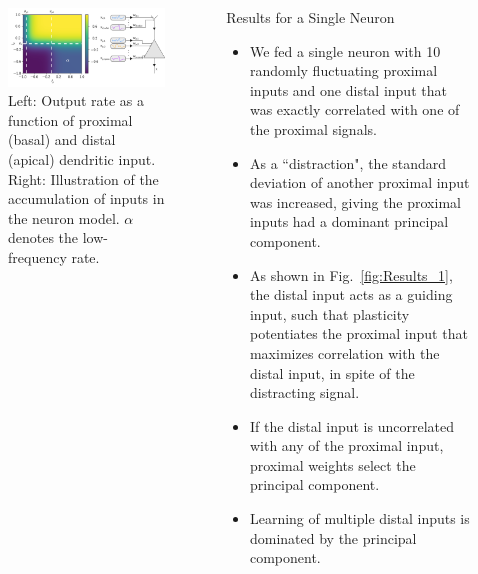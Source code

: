 \documentclass{beamer}
\begin{document}
\begin{frame}[t]
\begin{columns}[t]
\begin{column}{.4\textwidth}
\begin{figure}
\includegraphics[width=\textwidth]{../figures/fig1.pdf}
\caption{Left: Output rate as a function of proximal (basal) and distal (apical) dendritic input. Right: Illustration of the accumulation of inputs in the neuron model. $\alpha$ denotes the low-frequency rate.}
\label{fig:Model_Illustration}
\end{figure}


\end{column}

\begin{column}{.5\textwidth}
\begin{myblock}{Results for a Single Neuron}
\begin{itemize}
\item We fed a single neuron with 10 randomly fluctuating proximal inputs and one distal input that was exactly correlated with one of the proximal signals. 
\item As a ``distraction", the standard deviation of another proximal input was increased, giving the proximal inputs had a dominant principal component.
\item As shown in Fig.~\ref{fig:Results_1}, the distal input acts as a guiding input, such that plasticity potentiates the proximal input that maximizes correlation with the distal input, in spite of the distracting signal.
\item If the distal input is uncorrelated with any of the proximal input, proximal weights select the principal component.
\item Learning of multiple distal inputs is dominated by the principal component.
\end{itemize}
\end{myblock}


\end{column}
\end{columns}
\end{frame}
\end{document}
